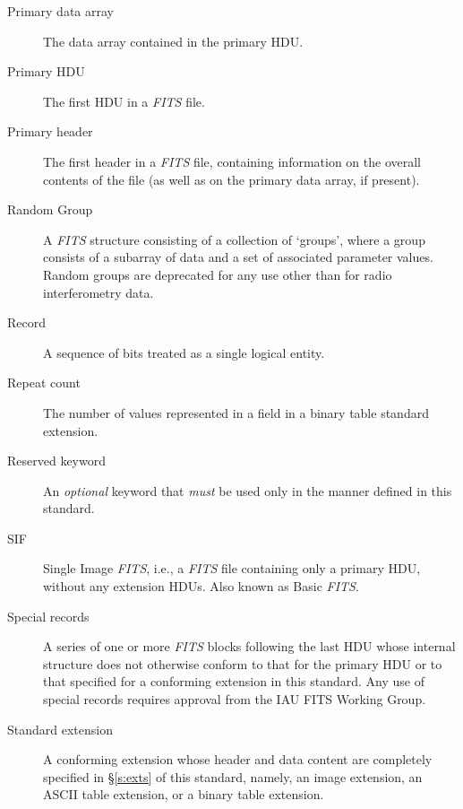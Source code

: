 \documentclass[11pt,makeidx]{book}     %
\begin{document}
\begin{description}
\item[Primary data array] The
   data array contained in the primary HDU.
\item[Primary HDU] The first HDU in a {\em FITS\/} file.
\item[Primary header] The first header 
   in a {\em FITS\/} file, containing information on the 
   overall contents of the file (as well as on the
   primary data array, if present).
\item[Random Group] A {\em FITS\/} structure consisting of a collection
of `groups', where a group consists of a subarray of data and a
set of associated parameter values.  Random groups are deprecated for
any use other than for radio interferometry data.
\item[Record] A sequence of bits treated as a single logical entity.

\item[Repeat count] The number of values 
    represented in a field in a binary table standard extension.
\item[Reserved keyword] An {\em optional} keyword 
   that {\em must} be used only in the manner defined in this standard.
\item[SIF] Single Image {\em FITS\/}, i.e., a {\em FITS\/} file containing only a primary
    HDU, without any extension HDUs.  Also known as Basic {\em FITS\/}.
\item[Special records] A series of one or more {\em FITS\/} blocks 
   following the last HDU 
   whose internal structure does not otherwise conform to that for
   the primary HDU or to that specified for a conforming 
   extension in
   this standard.  Any use of special records requires approval from
   the IAU FITS Working Group.
\item[Standard extension] A
     conforming 
     extension 
   whose header and data 
   content are completely specified in \S\ref{s:exts} of this standard, namely,
   an image extension, an ASCII table extension, or a binary table extension.
\end{description}

\end{document}
